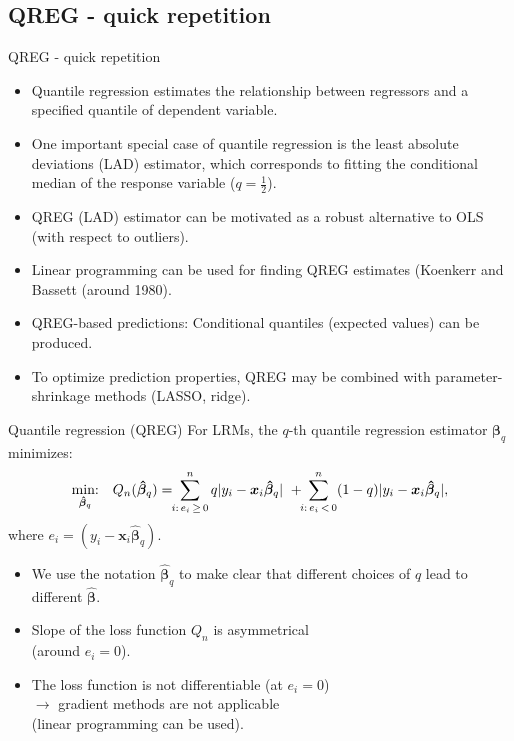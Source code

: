 \documentclass{beamer}
\begin{document}
\subsection{QREG - quick repetition}
\begin{frame}{QREG - quick repetition}
\begin{itemize}
\item Quantile regression estimates the relationship between regressors and a specified quantile of dependent variable.
\medskip
\item One important special case of quantile regression is the least absolute deviations (LAD) estimator, which corresponds to fitting the conditional median of the response variable ($q=\frac{1}{2}$).
\medskip
\item QREG (LAD) estimator can be motivated as a robust  alternative to OLS (with respect to outliers).
\medskip
\item Linear programming can be used for finding QREG estimates (Koenkerr and Bassett (around 1980).
\medskip
\item QREG-based predictions: Conditional quantiles (expected values) can be produced.
\medskip
\item To optimize prediction properties, QREG may be combined with parameter-shrinkage methods (LASSO, ridge).
\end{itemize}
\end{frame}
\begin{frame}{Quantile regression (QREG)}
For LRMs, the $q$-th quantile regression estimator $\bm{\beta}_q$ minimizes:
$$
\underset{\bm{\hat{\beta}}_q}{\textnormal{min:}} \quad Q_n(\bm{\hat{\beta}}_q) =
\! \! \sum^n_{i:\, e_i \, \geq \, 0} q|y_i - \bm{x}_i\bm{\hat{\beta}}_q| \,\, +
\! \! \sum^n_{i:\, e_i\, < \, 0} (1-q)|y_i - \bm{x}_i\bm{\hat{\beta}}_q|,
$$
where $e_i = (y_i - \bm{x}_i\bm{\hat{\beta}}_q)$.

\begin{itemize}
    \item We use the notation $\bm{\hat{\beta}}_q$ to make clear that different choices of $q$ lead to different  $\bm{\hat{\beta}}$.
    \item Slope of the loss function $Q_n$ is asymmetrical \\(around $e_i=0$).
    \item The loss function is not differentiable (at $e_i=0$) \\$\rightarrow$ gradient methods are not applicable \\(linear programming can be used).
\end{itemize}
\end{frame}
\end{document}
